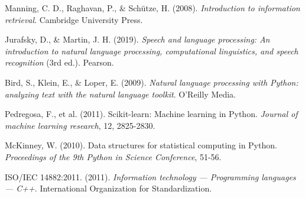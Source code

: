 \documentclass[12pt,a4paper]{article}
\begin{document}
\begin{thebibliography}{9}

Manning, C. D., Raghavan, P., \& Schütze, H. (2008). 
\textit{Introduction to information retrieval}. 
Cambridge University Press.

Jurafsky, D., \& Martin, J. H. (2019). 
\textit{Speech and language processing: An introduction to natural language processing, computational linguistics, and speech recognition} (3rd ed.). 
Pearson.

Bird, S., Klein, E., \& Loper, E. (2009). 
\textit{Natural language processing with Python: analyzing text with the natural language toolkit}. 
O'Reilly Media.

Pedregosa, F., et al. (2011). 
Scikit-learn: Machine learning in Python. 
\textit{Journal of machine learning research}, 12, 2825-2830.

McKinney, W. (2010). 
Data structures for statistical computing in Python. 
\textit{Proceedings of the 9th Python in Science Conference}, 51-56.

ISO/IEC 14882:2011. (2011). 
\textit{Information technology — Programming languages — C++}. 
International Organization for Standardization.

\end{thebibliography}
\end{document}
